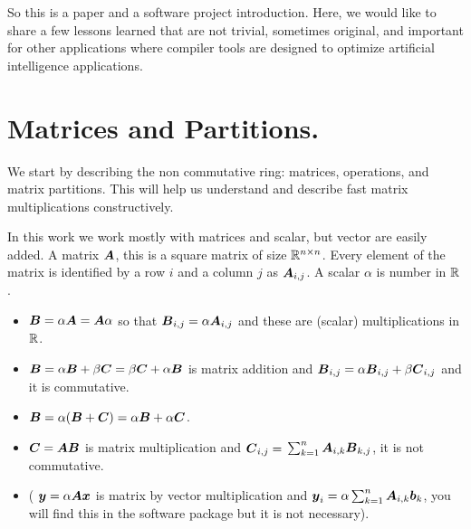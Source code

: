 \documentclass[acmsmall]{acmart}
\begin{document}
So this is a paper and a software project introduction. Here, we would
like to share a few lessons learned that are not trivial, sometimes
original, and important for other applications where compiler tools
are designed to optimize artificial intelligence applications.


\section{Matrices and Partitions.}
\label{sec:matrices}
We start by describing the non commutative ring: matrices, operations,
and matrix partitions. This will help us understand and describe fast
matrix multiplications constructively.

In this work we work mostly with matrices and scalar, but vector are
easily added. A matrix ${\boldsymbol A}$, this is a square matrix of size
$\mathbb{R}^{n\times n}$. Every element of the matrix is identified by a row
$i$ and a column $j$ as ${\boldsymbol A}_{i,j}$. A scalar $\alpha$ is number in
$\mathbb{R}$.
\begin{itemize}
  \item ${\boldsymbol B} = \alpha{\boldsymbol A} = {\boldsymbol A}\alpha$ so that ${\boldsymbol B}_{i,j} =
    \alpha{\boldsymbol A}_{i,j}$ and these are (scalar) multiplications in
    $\mathbb{R}$.
  \item ${\boldsymbol B} = \alpha{\boldsymbol B} + \beta{\boldsymbol C}= \beta{\boldsymbol C} +
    \alpha{\boldsymbol B}$ is matrix addition and ${\boldsymbol B}_{i,j} =
    \alpha{\boldsymbol B}_{i,j} + \beta{\boldsymbol C}_{i,j}$ and it is commutative.
  \item ${\boldsymbol B} = \alpha({\boldsymbol B} + {\boldsymbol C}) = \alpha{\boldsymbol B} +
    \alpha{\boldsymbol C}$. 
  \item ${\boldsymbol C}= {\boldsymbol A}{\boldsymbol B}$ is matrix multiplication and ${\boldsymbol C}_{i,j}=$ 
    $\sum_{k=1}^n {\boldsymbol A}_{i,k}{\boldsymbol B}_{k,j}$, it is not commutative.
  \item ( ${\boldsymbol y}= \alpha{\boldsymbol A}{\boldsymbol x}$ is matrix by vector
    multiplication and ${\boldsymbol y}_{i}=\alpha \sum_{k=1}^n
    {\boldsymbol A}_{i,k}{\boldsymbol b}_{k}$, you will find this in the software
    package but it is not necessary).
\end{itemize}
\end{document}
